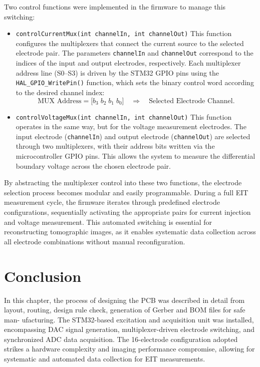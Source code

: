 Two control functions were implemented in the firmware to manage this switching:

\begin{itemize}
    \item \texttt{controlCurrentMux(int channelIn, int channelOut)}  
    This function configures the multiplexers that connect the current source to the selected electrode pair. The parameters \texttt{channelIn} and \texttt{channelOut} correspond to the indices of the input and output electrodes, respectively. Each multiplexer address line (S0--S3) is driven by the STM32 GPIO pins using the \texttt{HAL\_GPIO\_WritePin()} function, which sets the binary control word according to the desired channel index:
    \[
    \text{MUX Address} = \bigl[b_3\; b_2\; b_1\; b_0 \bigr] \quad \Rightarrow \quad \text{Selected Electrode Channel}.
    \]

    \item \texttt{controlVoltageMux(int channelIn, int channelOut)}  
    This function operates in the same way, but for the voltage measurement electrodes. The input electrode (\texttt{channelIn}) and output electrode (\texttt{channelOut}) are selected through two multiplexers, with their address bits written via the microcontroller GPIO pins. This allows the system to measure the differential boundary voltage across the chosen electrode pair.
\end{itemize}

By abstracting the multiplexer control into these two functions, the electrode selection process becomes modular and easily programmable. During a full EIT measurement cycle, the firmware iterates through predefined electrode configurations, sequentially activating the appropriate pairs for current injection and voltage measurement. This automated switching is essential for reconstructing tomographic images, as it enables systematic data collection across all electrode combinations without manual reconfiguration.





\section{ Conclusion}
In this chapter, the process of designing the PCB was described in detail from layout, routing, design rule check, generation of Gerber and BOM files for safe man-
ufacturing. The STM32-based excitation and acquisition unit was installed,
encompassing DAC signal generation, multiplexer-driven electrode switching, and
synchronized ADC data acquisition. The 16-electrode configuration adopted
strikes a hardware complexity and imaging performance compromise, allowing for
systematic and automated data collection for EIT measurements.
